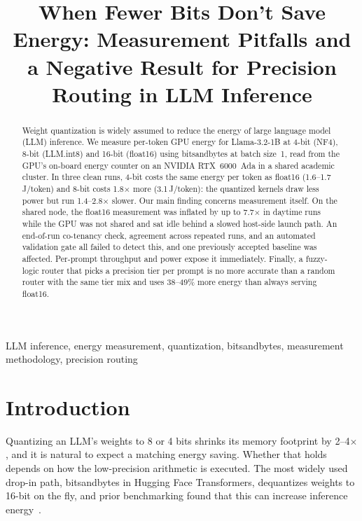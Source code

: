 \documentclass[conference]{IEEEtran}
\begin{document}
\title{When Fewer Bits Don't Save Energy: Measurement Pitfalls and a Negative Result for Precision Routing in LLM Inference}

\author{
}

\maketitle

\begin{abstract}
Weight quantization is widely assumed to reduce the energy of large language model (LLM) inference. We measure per-token GPU energy for Llama-3.2-1B at 4-bit (NF4), 8-bit (LLM.int8) and 16-bit (float16) using bitsandbytes at batch size~1, read from the GPU's on-board energy counter on an NVIDIA RTX~6000~Ada in a shared academic cluster. In three clean runs, 4-bit costs the same energy per token as float16 (1.6--1.7\,J/token) and 8-bit costs 1.8$\times$ more (3.1\,J/token): the quantized kernels draw less power but run 1.4--2.8$\times$ slower. Our main finding concerns measurement itself. On the shared node, the float16 measurement was inflated by up to 7.7$\times$ in daytime runs while the GPU was not shared and sat idle behind a slowed host-side launch path. An end-of-run co-tenancy check, agreement across repeated runs, and an automated validation gate all failed to detect this, and one previously accepted baseline was affected. Per-prompt throughput and power expose it immediately. Finally, a fuzzy-logic router that picks a precision tier per prompt is no more accurate than a random router with the same tier mix and uses 38--49\% more energy than always serving float16.
\end{abstract}

\begin{IEEEkeywords}
LLM inference, energy measurement, quantization, bitsandbytes, measurement methodology, precision routing
\end{IEEEkeywords}

\section{Introduction}
Quantizing an LLM's weights to 8 or 4 bits shrinks its memory footprint by 2--4$\times$, and it is natural to expect a matching energy saving. Whether that holds depends on how the low-precision arithmetic is executed. The most widely used drop-in path, bitsandbytes in Hugging Face Transformers, dequantizes weights to 16-bit on the fly, and prior benchmarking found that this can increase inference energy~\cite{poddar2025}.
\end{document}
